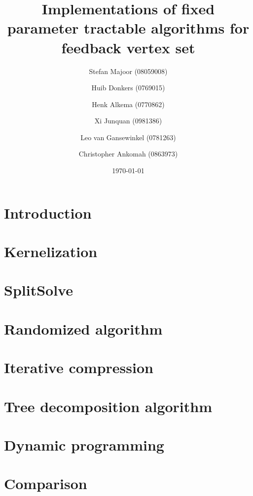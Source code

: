 \documentclass[a4paper,10pt]{article}
\title{Implementations of fixed parameter tractable algorithms for feedback vertex set}
\author{
	Stefan Majoor (08059008)
	\and
	Huib Donkers (0769015)
	\and
	Henk Alkema (0770862)
	\and
	Xi Junquan (0981386)
	\and
	Leo van Gansewinkel (0781263)
	\and
	Christopher Ankomah (0863973)
}
\date{\today}
\begin{document}
\maketitle
\setcounter{tocdepth}{2}
\tableofcontents
\clearpage

\begin{abstract}

\end{abstract}

\section{Introduction} \label{sec:intro}


\section{Kernelization} \label{sec:kern}


\section{SplitSolve} \label{sec:splitsolve}


\section{Randomized algorithm} \label{sec:rand}


\section{Iterative compression} \label{sec:itcomp}


\section{Tree decomposition algorithm} \label{sec:treewidth}


\section{Dynamic programming} \label{sec:dynamic program}


\section{Comparison} \label{sec:comparison}

\end{document}
